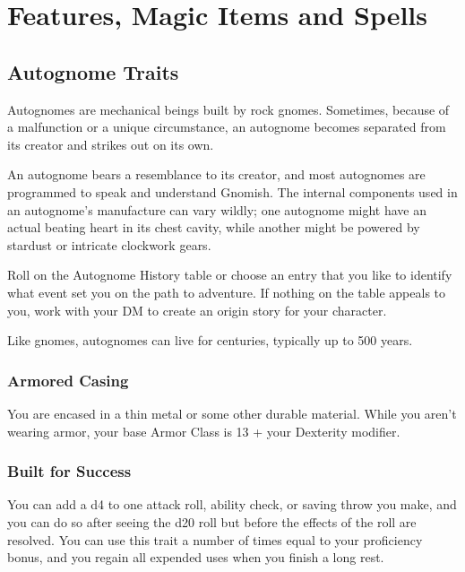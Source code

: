 \documentclass[letterpaper,openany,oneside,twocolumn]{book}
\begin{document}
\onecolumn


\rendercharactersheet

\renderbackgroundsheet

\renderspellsheet


\restoregeometry
\twocolumn

\chapter*{Features, Magic Items and Spells}

\section*{Autognome Traits}
Autognomes are mechanical beings built by rock gnomes. Sometimes, because of a malfunction or a unique circumstance, an autognome becomes separated from its creator and strikes out on its own.

An autognome bears a resemblance to its creator, and most autognomes are programmed to speak and understand Gnomish. The internal components used in an autognome's manufacture can vary wildly; one autognome might have an actual beating heart in its chest cavity, while another might be powered by stardust or intricate clockwork gears.

Roll on the Autognome History table or choose an entry that you like to identify what event set you on the path to adventure. If nothing on the table appeals to you, work with your DM to create an origin story for your character.

Like gnomes, autognomes can live for centuries, typically up to 500 years.
\subsection*{Armored Casing}
You are encased in a thin metal or some other durable material. While you aren't wearing armor, your base Armor Class is 13 + your Dexterity modifier.
\subsection*{Built for Success}
You can add a d4 to one attack roll, ability check, or saving throw you make, and you can do so after seeing the d20 roll but before the effects of the roll are resolved. You can use this trait a number of times equal to your proficiency bonus, and you regain all expended uses when you finish a long rest.
\end{document}
